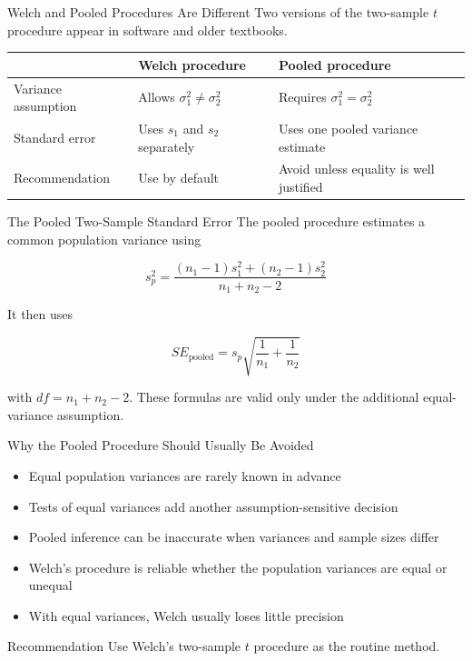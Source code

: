 \documentclass[aspectratio=169,10pt]{beamer}
\begin{document}
\begin{frame}{Welch and Pooled Procedures Are Different}
Two versions of the two-sample $t$ procedure appear in software and older textbooks.

\begin{center}
\begin{tabularx}{0.92\textwidth}{>{\RaggedRight\arraybackslash}p{} X X}
\toprule
 & \textbf{Welch procedure} & \textbf{Pooled procedure} \\
\midrule
Variance assumption & Allows $\sigma_1^2\ne\sigma_2^2$ & Requires $\sigma_1^2=\sigma_2^2$ \\
Standard error & Uses $s_1$ and $s_2$ separately & Uses one pooled variance estimate \\
Recommendation & Use by default & Avoid unless equality is well justified \\
\bottomrule
\end{tabularx}
\end{center}
\end{frame}

\begin{frame}{The Pooled Two-Sample Standard Error}
The pooled procedure estimates a common population variance using

\[
s_p^2=
\frac{(n_1-1)s_1^2+(n_2-1)s_2^2}
{n_1+n_2-2}
\]

It then uses

\[
SE_{\text{pooled}}
=s_p\sqrt{\frac{1}{n_1}+\frac{1}{n_2}}
\]

with $df=n_1+n_2-2$. These formulas are valid only under the additional equal-variance assumption.
\end{frame}

\begin{frame}{Why the Pooled Procedure Should Usually Be Avoided}
\begin{itemize}
  \item Equal population variances are rarely known in advance
  \item Tests of equal variances add another assumption-sensitive decision
  \item Pooled inference can be inaccurate when variances and sample sizes differ
  \item Welch's procedure is reliable whether the population variances are equal or unequal
  \item With equal variances, Welch usually loses little precision
\end{itemize}

\begin{block}{Recommendation}
Use Welch's two-sample $t$ procedure as the routine method.
\end{block}
\end{frame}
\end{document}
